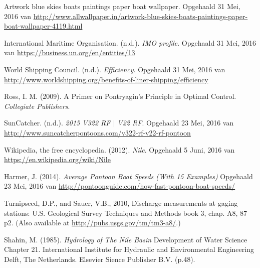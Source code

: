 \begin{thebibliography}{9}

	Artwork blue skies boats paintings paper boat wallpaper. Opgehaald 31 Mei, 2016 van \url{http://www.allwallpaper.in/artwork-blue-skies-boats-paintings-paper-boat-wallpaper-4119.html}
	
	
	International Maritime Organisation. (n.d.). \emph{IMO profile}. Opgehaald 31 Mei, 2016 van \url{https://business.un.org/en/entities/13}

	World Shipping Council. (n.d.). \emph{Efficiency}. Opgehaald 31 Mei, 2016 van \url{http://www.worldshipping.org/benefits-of-liner-shipping/efficiency}

	Ross, I. M. (2009). A Primer on Pontryagin's Principle in Optimal Control. \emph{Collegiate Publishers}.

	SunCatcher. (n.d.). \emph{2015 V322 RF \(|\) V22 RF}. Opgehaald 23 Mei, 2016 van \url{http://www.suncatcherpontoons.com/v322-rf-v22-rf-pontoon}

	Wikipedia, the free encyclopedia. (2012). \emph{Nile}. Opgehaald 5 Juni, 2016 van \url{https://en.wikipedia.org/wiki/Nile}
	
	Harmer, J.  (2014). \emph{Average Pontoon Boat Speeds (With 15 Examples)} Opgehaald 23 Mei, 2016 van \url{http://pontoonguide.com/how-fast-pontoon-boat-speeds/}
	
	Turnipseed, D.P., and Sauer, V.B., 2010, Discharge measurements at gaging 		stations: U.S. Geological Survey 
	Techniques and Methods book 3, chap. A8, 87 p2. (Also available at 
	\url{http://pubs.usgs.gov/tm/tm3-a8/}.)
	\begin{comment}	
	Turnipseed, D.P. en Sauer V.B. (2010). Discharge Measurements at Gaging Stations Chapter 8 of Book 3, Section A. \emph{Discharge Measurements at Gaging Stations: Velocity-Area Method}. U.S. Geological Survey, Reston, Virginia. (p.2).
	\end{comment}
	
	Shahin, M. (1985). \emph{Hydrology of The Nile Basin} Development of Water Science Chapter 21. International Institute for Hydraulic and Environmental Engineering Delft, The Netherlands. Elsevier Sience Publisher B.V. (p.48).
\end{thebibliography}
